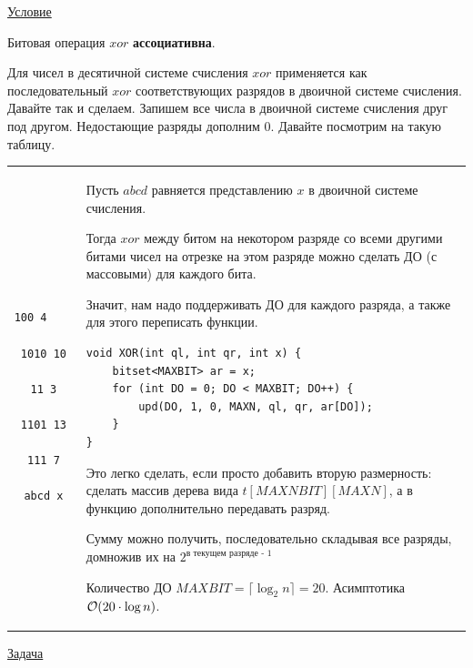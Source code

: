 
\href{https://codeforces.com/problemset/problem/242/E}{Условие}

Битовая операция $xor$ {\bf ассоциативна}. 

Для чисел в десятичной системе счисления $xor$ применяется как последовательный $xor$ соответствующих разрядов в двоичной системе счисления. Давайте так и сделаем. Запишем все числа в двоичной системе счисления друг под другом. Недостающие разряды дополним $0$. Давайте посмотрим на такую таблицу. 

\down
\begin{tabular}{cm{}}
	\begin{minipage}{2.5cm}
		\begin{verbatim}
			 100 4    
			1010 10
			  11 3
			1101 13
			 111 7
			abcd x
		\end{verbatim}
	\end{minipage}  
	&
	Пусть $abcd$ равняется представлению $x$ в двоичной системе счисления.
	
	Тогда $xor$ между битом на некотором разряде со всеми другими битами чисел на отрезке на этом разряде можно сделать ДО (с массовыми) для каждого бита.
	
	Значит, нам надо поддерживать ДО для каждого разряда, а также для этого переписать функции.
	
	\up \up
	\begin{verbatim}
void XOR(int ql, int qr, int x) {
	bitset<MAXBIT> ar = x;
	for (int DO = 0; DO < MAXBIT; DO++) {
		upd(DO, 1, 0, MAXN, ql, qr, ar[DO]);
	}
}
	\end{verbatim}
	\up \up
	
	
	Это легко сделать, если просто добавить вторую размерность: сделать массив дерева вида $t[MAXNBIT][MAXN]$,  а в функцию дополнительно передавать разряд.
	
	Сумму можно получить, последовательно складывая все разряды, домножив их на $2^{\text{в текущем разряде - 1}}$
	
	Количество ДО $MAXBIT=\lceil\log_2 n\rceil = 20$. Асимптотика $\mathcal{O}(20 \cdot \log n)$.
\end{tabular}

\pagebreak


\href{https://codeforces.com/contest/915/problem/E}{Задача} \href{https://codeforces.com/contest/915/submission/106223693}{}

